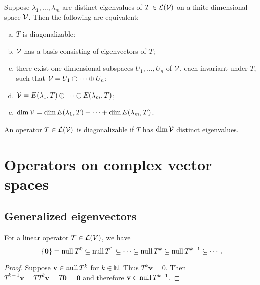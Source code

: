 \begin{thm}
  \label{thm:diagonalizabilityConditions}
  Suppose $\lambda_1, \ldots, \lambda_m$ are distinct eigenvalues
  of $T\in {\cal L}({\cal V})$
  on a finite-dimensional space ${\cal V}$.
  Then the following are equivalent:
  \begin{enumerate}[(a)]\itemsep0em
  \item $T$ is diagonalizable;
  \item ${\cal V}$ has a basis consisting of eigenvectors of $T$;
  \item there exist one-dimensional subspaces
    $U_1, \ldots, U_n$ of ${\cal V}$,
    each invariant under $T$, such that
      ${\cal V} = U_1 \oplus \cdots \oplus U_n$;
  \item ${\cal V} = E(\lambda_1,T) \oplus \cdots \oplus E(\lambda_m,T)$; 
  \item $\dim {\cal V} = \dim E(\lambda_1,T) + \cdots + \dim E(\lambda_m,T)$.
  \end{enumerate}
\end{thm}

\begin{coro}
  An operator $T\in {\cal L}({\cal V})$ is diagonalizable
  if $T$ has $\dim {\cal V}$ distinct eigenvalues.
\end{coro}


\section{Operators on complex vector spaces}
\label{sec:oper-compl-vect}

\subsection{Generalized eigenvectors}
\label{sec:gener-eigenv}

\begin{lem}
  \label{lem:nullSpacePowerInclusion}
  For a linear operator $T\in {\cal L}(V)$, we have
  \begin{equation}
    \label{eq:nullSpacePowerInclusion}
    \{\mathbf{0}\} = \mathrm{null}\, T^0
    \subseteq \mathrm{null}\,T^1 \subseteq \cdots
    \subseteq \mathrm{null}\,T^k \subseteq \mathrm{null}\, T^{k+1}  \subseteq \cdots .
  \end{equation}
\end{lem}
\begin{proof}
  Suppose $\mathbf{v}\in\mathrm{null}\, T^k$ for $k\in\mathbb{N}$.
  Thus $T^k\mathbf{v}=0$.
  Then $T^{k+1}\mathbf{v}= T T^k\mathbf{v}=T\mathbf{0}=\mathbf{0}$
  and therefore $\mathbf{v}\in\mathrm{null}\, T^{k+1}$.
\end{proof}

